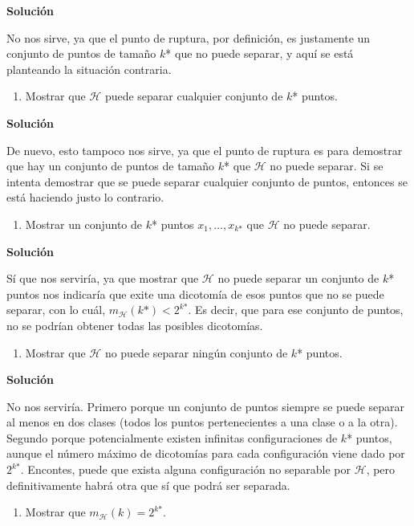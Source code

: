 \documentclass[11pt,a4paper]{article}
\newcommand{\answer}{\noindent\textbf{Solución}}
\begin{document}
\answer

No nos sirve, ya que el punto de ruptura, por definición, es justamente un conjunto de puntos de tamaño $k$* que no puede
separar, y aquí se está planteando la situación contraria.

\begin{enumerate}[resume,label=\textit{\alph*})]
	\item Mostrar que $\mathcal{H}$ puede separar cualquier conjunto de $k$* puntos.
\end{enumerate}

\answer

De nuevo, esto tampoco nos sirve, ya que el punto de ruptura es para demostrar que hay un conjunto de puntos de tamaño
$k$* que $\mathcal{H}$ no puede separar. Si se intenta demostrar que se puede separar cualquier conjunto de puntos, entonces
se está haciendo justo lo contrario.

\begin{enumerate}[resume,label=\textit{\alph*})]
	\item Mostrar un conjunto de $k$* puntos  $x_1, \dots, x_{k\text{*}}$ que $\mathcal{H}$ no puede separar.
\end{enumerate}

\answer

Sí que nos serviría, ya que mostrar que $\mathcal{H}$ no puede separar un conjunto de $k$* puntos nos indicaría que exite una
dicotomía de esos puntos que no se puede separar, con lo cuál, $m_\mathcal{H}(k\text{*}) < 2^{k\text{*}}$.
Es decir, que para ese conjunto de puntos, no se podrían obtener todas las posibles dicotomías.

\begin{enumerate}[resume,label=\textit{\alph*})]
	\item Mostrar que $\mathcal{H}$ no puede separar ningún conjunto de $k$* puntos.
\end{enumerate}

\answer

No nos serviría. Primero porque un conjunto de puntos siempre se puede separar al menos en dos clases (todos los puntos
pertenecientes a una clase o a la otra). Segundo porque potencialmente existen infinitas configuraciones de $k$* puntos, 
aunque el número máximo de dicotomías para cada configuración viene dado por $2^{k\text{*}}$. Encontes, puede que exista 
alguna configuración no separable por $\mathcal{H}$, pero definitivamente habrá otra que sí que podrá ser
separada.

\begin{enumerate}[resume,label=\textit{\alph*})]
	\item Mostrar que $m_\mathcal{H}(k) = 2^{k\text{*}}$.
\end{enumerate}
\end{document}
